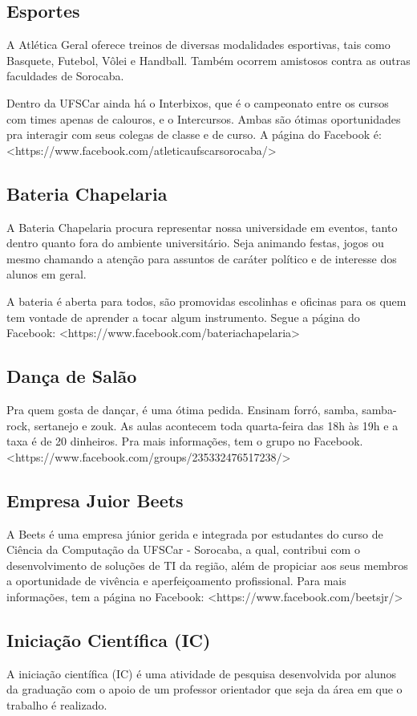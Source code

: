 \subsection{Esportes}
A Atlética Geral oferece treinos de diversas modalidades esportivas, tais como Basquete, Futebol, Vôlei e Handball. Também ocorrem amistosos contra as outras faculdades de Sorocaba.

Dentro da UFSCar ainda há o Interbixos, que é o campeonato entre os cursos com times apenas de calouros, e o Intercursos. Ambas são ótimas oportunidades pra interagir com seus colegas de classe e de curso. A página do Facebook é: <https://www.facebook.com/atleticaufscarsorocaba/>

\subsection{Bateria Chapelaria}
A Bateria Chapelaria procura representar nossa universidade em eventos, tanto dentro quanto fora do ambiente universitário. Seja animando festas, jogos ou mesmo chamando a atenção para assuntos de caráter político e de interesse dos alunos em geral.

A bateria é aberta para todos, são promovidas escolinhas e oficinas para os quem tem vontade de aprender a tocar algum instrumento. Segue a página do Facebook: <https://www.facebook.com/bateriachapelaria>

\subsection{Dança de Salão}
Pra quem gosta de dançar, é uma ótima pedida. Ensinam forró, samba, samba-rock, sertanejo e zouk. As aulas acontecem toda quarta-feira das 18h às 19h e a taxa é de 20 dinheiros. Pra mais informações, tem o grupo no Facebook. <https://www.facebook.com/groups/235332476517238/>

\subsection{Empresa Juior Beets}
A Beets é uma empresa júnior gerida e integrada por estudantes do curso de Ciência da Computação da UFSCar - Sorocaba, a qual, contribui com o desenvolvimento de soluções de TI da região, além de propiciar aos seus membros a oportunidade de vivência e aperfeiçoamento profissional. Para mais informações, tem a página no Facebook: <https://www.facebook.com/beetsjr/>

\subsection{Iniciação Científica (IC)}
A iniciação científica (IC) é uma atividade de pesquisa desenvolvida por alunos da graduação com o apoio de um professor orientador que seja da área em que o trabalho é realizado.

